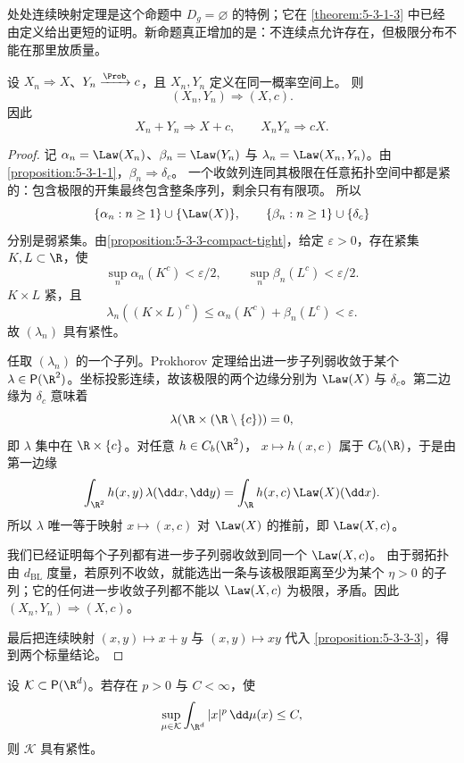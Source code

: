 处处连续映射定理是这个命题中 $D_g=\varnothing$ 的特例；它在
\cref{theorem:5-3-1-3} 中已经由定义给出更短的证明。新命题真正增加的是：不连续点允许存在，但极限分布不能在那里放质量。

\begin{proposition}[Slutsky 定理]\label{proposition:5-3-3-slutsky}
设 $X_n\Rightarrow X$、$Y_n\xrightarrow{\Prob}c$，且 $X_n,Y_n$ 定义在同一概率空间上。
则
\[
 (X_n,Y_n)\Rightarrow(X,c).
\]
因此
\[
 X_n+Y_n\Rightarrow X+c,\qquad
 X_nY_n\Rightarrow cX.
\]
\end{proposition}

\begin{proof}
记 $\alpha_n=\Law(X_n)$、$\beta_n=\Law(Y_n)$ 与
$\lambda_n=\Law(X_n,Y_n)$。由
\cref{proposition:5-3-1-1}，$\beta_n\Rightarrow\delta_c$。
一个收敛列连同其极限在任意拓扑空间中都是紧的：包含极限的开集最终包含整条序列，剩余只有有限项。
所以
\[
 \{\alpha_n:n\ge1\}\cup\{\Law(X)\},
 \qquad
 \{\beta_n:n\ge1\}\cup\{\delta_c\}
\]
分别是弱紧集。由\cref{proposition:5-3-3-compact-tight}，给定
$\varepsilon>0$，存在紧集 $K,L\subset\R$，使
\[
 \sup_n\alpha_n(K^c)<\varepsilon/2,\qquad
 \sup_n\beta_n(L^c)<\varepsilon/2.
\]
$K\times L$ 紧，且
\[
 \lambda_n((K\times L)^c)
 \le\alpha_n(K^c)+\beta_n(L^c)<\varepsilon.
\]
故 $(\lambda_n)$ 具有紧性。

任取 $(\lambda_n)$ 的一个子列。Prokhorov 定理给出进一步子列弱收敛于某个
$\lambda\in\mathsf P(\R^2)$。坐标投影连续，故该极限的两个边缘分别为
$\Law(X)$ 与 $\delta_c$。第二边缘为 $\delta_c$ 意味着
\[
 \lambda(\R\times(\R\setminus\{c\}))=0,
\]
即 $\lambda$ 集中在 $\R\times\{c\}$。对任意 $h\in C_b(\R^2)$，
$x\mapsto h(x,c)$ 属于 $C_b(\R)$，于是由第一边缘
\[
 \int_{\R^2}h(x,y)\,\lambda(\dd x,\dd y)
 =\int_\R h(x,c)\,\Law(X)(\dd x).
\]
所以 $\lambda$ 唯一等于映射 $x\mapsto(x,c)$ 对 $\Law(X)$ 的推前，即
$\Law(X,c)$。

我们已经证明每个子列都有进一步子列弱收敛到同一个 $\Law(X,c)$。
由于弱拓扑由 $d_{\mathrm{BL}}$ 度量，若原列不收敛，就能选出一条与该极限距离至少为某个
$\eta>0$ 的子列；它的任何进一步收敛子列都不能以 $\Law(X,c)$ 为极限，矛盾。因此
$(X_n,Y_n)\Rightarrow(X,c)$。

最后把连续映射 $(x,y)\mapsto x+y$ 与 $(x,y)\mapsto xy$ 代入
\cref{proposition:5-3-3-3}，得到两个标量结论。
\end{proof}

\begin{proposition}[矩界推出紧性]\label{proposition:5-3-3-4}
设 $\mathcal K\subset\mathsf P(\R^d)$。若存在 $p>0$ 与 $C<\infty$，使
\[
 \sup_{\mu\in\mathcal K}\int_{\R^d}|x|^p\,\dd\mu(x)\le C,
\]
则 $\mathcal K$ 具有紧性。
\end{proposition}

